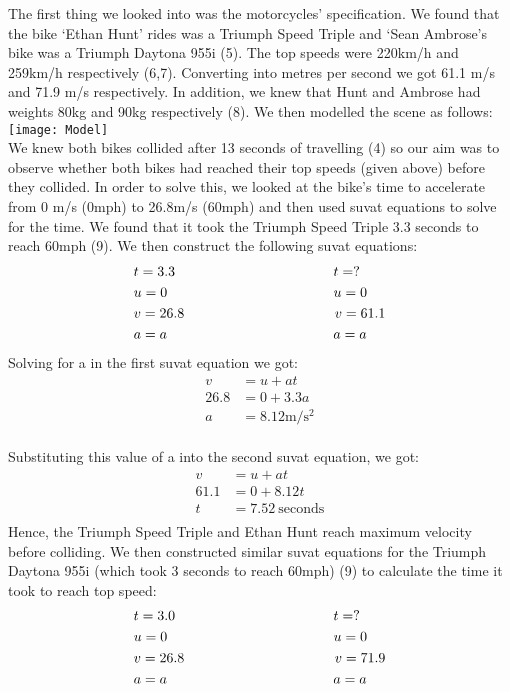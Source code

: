 \documentclass{article}
\begin{document}
The first thing we looked into was the motorcycles' specification. We found that the bike ‘Ethan Hunt’ rides was a Triumph Speed Triple and ‘Sean Ambrose’s bike was a Triumph Daytona 955i (5). The top speeds were 220km/h and 259km/h respectively (6,7). Converting into metres per second we got 61.1 m/s and 71.9 m/s respectively. In addition, we knew that Hunt and Ambrose had weights 80kg and 90kg respectively (8). We then modelled the scene as follows:\\
\texttt{[image: Model]}\\[5pt]
We knew both bikes collided after 13 seconds of travelling (4) so our aim was to observe whether both bikes had reached their top speeds (given above) before they collided. In order to solve this, we looked at the bike’s time to accelerate from 0 m/s (0mph) to 26.8m/s (60mph) and then used suvat equations to solve for the time. We found that it took the Triumph Speed Triple 3.3 seconds to reach 60mph (9). We then construct the following suvat equations:
\begin{align*}
&t = 3.3 \hspace{4cm} t=? \\
&u=0 \hspace{4.2cm} u=0\\
&v=26.8 \hspace{3.8cm} v=61.1\\
&a = a \hspace{4.2cm} a=a\\
\end{align*}
Solving for a in the first suvat equation we got:
\begin{align*}
v &= u + at\\
26.8 &=0 + 3.3a\\
a &=8.12 \text{m/s$^2$}
\end{align*}\\[5pt]
Substituting this value of a into the second suvat equation, we got:
\begin{align*}
v &= u + at\\
61.1 &=0 + 8.12t\\
t &=7.52 ~\text{seconds}\\
\end{align*}
Hence, the Triumph Speed Triple and Ethan Hunt reach maximum velocity before colliding. We then constructed similar suvat equations for the Triumph Daytona 955i (which took 3 seconds to reach 60mph) (9) to calculate the time it took to reach top speed:
\vspace{1mm}
\begin{align*}
&t = 3.0 \hspace{4cm} t=? \\
&u=0 \hspace{4.2cm} u=0\\
&v=26.8 \hspace{3.8cm} v=71.9\\
&a = a \hspace{4.2cm} a=a\\
\end{align*}
\end{document}
